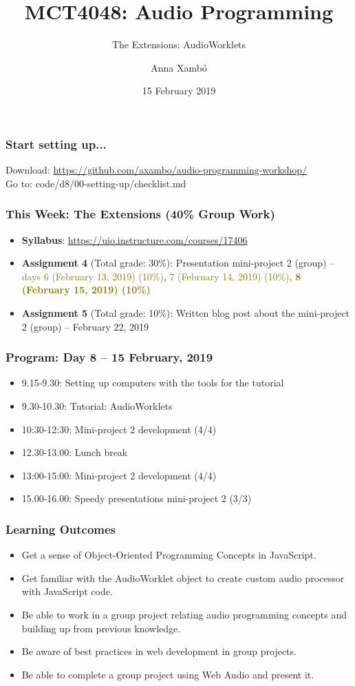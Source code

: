 \documentclass[screen, aspectratio=43]{beamer}
\title[AP-intro]{MCT4048: Audio Programming}
\subtitle{The Extensions: AudioWorklets}
\author[A. Xamb{\'o}]{Anna Xamb{\'o}}
\institute[NTNU]{Department of Music, NTNU}
\date{15 February 2019}
\begin{document}
\begin{frame}
  \titlepage
\end{frame}

%
\begin{frame}
\frametitle{Start setting up...}
Download: \url{https://github.com/axambo/audio-programming-workshop/} 
\\
\vspace{10 mm}
Go to: \textrm{code/d8/00-setting-up/checklist.md}
\end{frame}
%
\begin{frame}
\frametitle{This Week: The Extensions (40\% Group Work)}
\begin{itemize}
\item \textbf{Syllabus}: \url{https://uio.instructure.com/courses/17406}
\item \textbf{Assignment 4} (Total grade: 30\%): Presentation mini-project 2 (group) -- \textcolor{olive}{days 6 (February 13, 2019) (10\%)},  \textcolor{olive}{7 (February 14, 2019) (10\%)}, \textbf{\textcolor{olive}{8 (February 15, 2019) (10\%)}}
\item \textbf{Assignment 5} (Total grade: 10\%):  Written blog post about the mini-project 2 (group) -- February 22, 2019
\end{itemize}
\end{frame}
%
\begin{frame}
\frametitle{Program: Day 8 -- 15 February, 2019}
\begin{itemize}
\item 9.15-9.30: Setting up computers with the tools for the tutorial
\item 9.30-10.30: Tutorial: AudioWorklets
\item 10:30-12:30: Mini-project 2 development (4/4)
\item 12.30-13.00: Lunch break
\item 13:00-15:00: Mini-project 2 development (4/4)
\item 15.00-16.00: Speedy presentations mini-project 2 (3/3)
\end{itemize}
\end{frame}
%
\begin{frame}
\frametitle{Learning Outcomes}
\begin{itemize}
\item Get a sense of Object-Oriented Programming Concepts in JavaScript.
\item Get familiar with the AudioWorklet object to create custom audio processor with JavaScript code.
\item Be able to work in a group project relating audio programming concepts and building up from previous knowledge.
\item Be aware of best practices in web development in group projects.
\item Be able to complete a group project using Web Audio and present it.
\end{itemize}
\end{frame}
\end{document}
